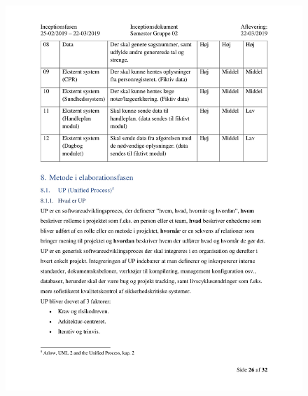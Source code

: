 \begin{figure}[hb]
  \includegraphics[scale = 0.33]{./PNG/Inceptions/Gruppe 02 + InceptionsDokument-27.jpg} 
\end{figure}

